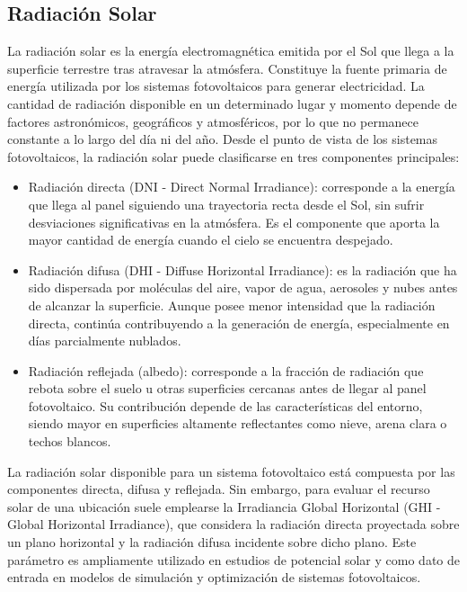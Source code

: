 \documentclass[12pt, a4paper]{article}
\begin{document}
\subsection{Radiación Solar}
La radiación solar es la energía electromagnética emitida por el Sol que llega a la superficie terrestre tras atravesar la atmósfera. Constituye la fuente primaria de energía utilizada por los sistemas fotovoltaicos para generar electricidad. La cantidad de radiación disponible en un determinado lugar y momento depende de factores astronómicos, geográficos y atmosféricos, por lo que no permanece constante a lo largo del día ni del año.
Desde el punto de vista de los sistemas fotovoltaicos, la radiación solar puede clasificarse en tres componentes principales:
\begin{itemize}
    \item Radiación directa (DNI - Direct Normal Irradiance): corresponde a la energía que llega al panel siguiendo una trayectoria recta desde el Sol, sin sufrir desviaciones significativas en la atmósfera. Es el componente que aporta la mayor cantidad de energía cuando el cielo se encuentra despejado.
    \item Radiación difusa (DHI - Diffuse Horizontal Irradiance): es la radiación que ha sido dispersada por moléculas del aire, vapor de agua, aerosoles y nubes antes de alcanzar la superficie. Aunque posee menor intensidad que la radiación directa, continúa contribuyendo a la generación de energía, especialmente en días parcialmente nublados.
    \item Radiación reflejada (albedo): corresponde a la fracción de radiación que rebota sobre el suelo u otras superficies cercanas antes de llegar al panel fotovoltaico. Su contribución depende de las características del entorno, siendo mayor en superficies altamente reflectantes como nieve, arena clara o techos blancos.
\end{itemize}
La radiación solar disponible para un sistema fotovoltaico está compuesta por las componentes directa, difusa y reflejada. Sin embargo, para evaluar el recurso solar de una ubicación suele emplearse la Irradiancia Global Horizontal (GHI - Global Horizontal Irradiance), que considera la radiación directa proyectada sobre un plano horizontal y la radiación difusa incidente sobre dicho plano. Este parámetro es ampliamente utilizado en estudios de potencial solar y como dato de entrada en modelos de simulación y optimización de sistemas fotovoltaicos.
\end{document}
